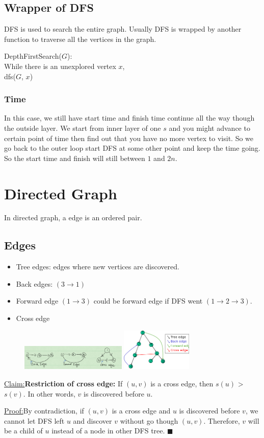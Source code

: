 \documentclass[en,hazy,blue,screen,14pt]{elegantnote}
\newcommand\tab[1][1cm]{\hspace*{#1}}
\newenvironment{claim}[1]{\par\noindent\underline{Claim:}\space#1}{}
\newenvironment{claimproof}[1]{\par\noindent\underline{Proof:}\space#1}{\hfill $\blacksquare$}
\begin{document}
\subsection{Wrapper of DFS}
DFS is used to search the entire graph. Usually DFS is wrapped by another 
function to traverse all the vertices in the graph.

DepthFirstSearch($G$):\\
\tab \tab While there is an unexplored vertex $x$,\\
\tab \tab \tab dfs($G$, $x$)

\subsubsection{Time}
In this case, we still have start time and finish time continue all the way 
though the outside layer. We start from inner layer of one $s$ and you might 
advance to certain point of time then find out that you have no more vertex to 
visit. So we go back to the outer loop start DFS at some other point and keep 
the time going. So the start time and finish will still between $1$ and $2n$.
\section{Directed Graph}
In directed graph, a edge is an ordered pair. 
\subsection{Edges}
\begin{itemize}
 \item Tree edges: edges where new vertices are discovered.
 \item Back edges: $(3 \rightarrow 1)$
 \item Forward edge $(1 \rightarrow 3)$ could be forward edge if DFS went $(1 
\rightarrow 2 \rightarrow 3)$.
 \item Cross edge
\end{itemize}

\begin{figure}[H]
\centering
\includegraphics[width=0.45\textwidth]{edges.png}
\includegraphics[width=0.3\textwidth]{edges-2.png}
\end{figure}
\begin{claim}
\textbf{Restriction of cross edge:} If $(u, v)$ is a cross edge, then 
$s(u)$ > $s(v)$. In other words, $v$ is discovered before $u$.
\end{claim}
\begin{claimproof}
By contradiction, if $(u, v)$ is a cross edge and $u$ is discovered before $v$, 
we cannot let DFS left $u$ and discover $v$ without go though $(u, v)$. 
Therefore, $v$ will be a child of $u$ instead of a node in other DFS tree.
\end{claimproof}
\end{document}
